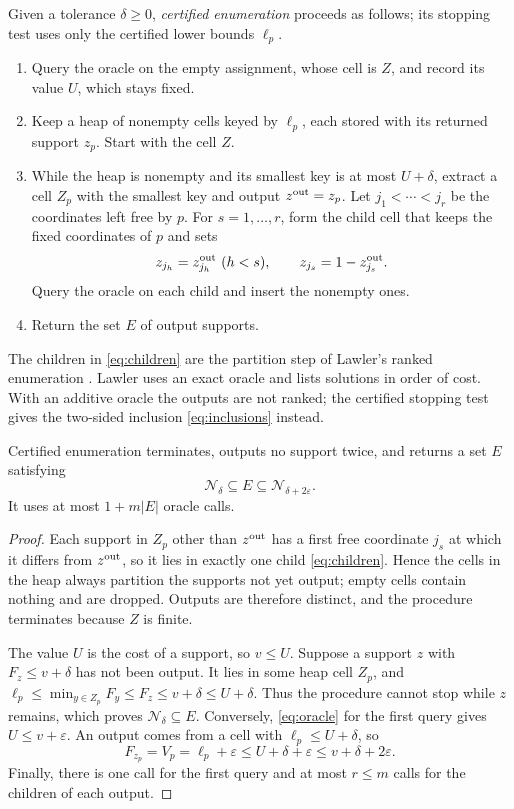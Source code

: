 Given a tolerance $\delta\ge0$, \emph{certified enumeration} proceeds as
follows; its stopping test uses only the certified lower bounds $\ell_p$.
\begin{enumerate}
\item Query the oracle on the empty assignment, whose cell is $Z$, and
 record its value $U$, which stays fixed.
\item Keep a heap of nonempty cells keyed by $\ell_p$, each stored with
 its returned support $z_p$. Start with the cell $Z$.
\item While the heap is nonempty and its smallest key is at most
 $U+\delta$, extract a cell $Z_p$ with the smallest key and output
 $z^{\rm out}=z_p$. Let $j_1<\cdots<j_r$ be the coordinates left free by
 $p$. For $s=1,\ldots,r$, form the child cell that keeps the fixed
 coordinates of $p$ and sets
 \begin{equation}\label{eq:children}
  z_{j_h}=z^{\rm out}_{j_h}\ (h<s),\qquad
  z_{j_s}=1-z^{\rm out}_{j_s}.
 \end{equation}
 Query the oracle on each child and insert the nonempty ones.
\item Return the set $E$ of output supports.
\end{enumerate}
The children in \eqref{eq:children} are the partition step of Lawler's
ranked enumeration \cite{Lawler}. Lawler uses an exact oracle and lists
solutions in order of cost. With an additive oracle the outputs are not
ranked; the certified stopping test gives the two-sided inclusion
\eqref{eq:inclusions} instead.

\begin{lemma}\label{lem:enumeration}
Certified enumeration terminates, outputs no support twice, and returns a
set $E$ satisfying
\begin{equation}\label{eq:inclusions}
 \mathcal N_\delta\subseteq E\subseteq\mathcal N_{\delta+2\varepsilon}.
\end{equation}
It uses at most $1+m|E|$ oracle calls.
\end{lemma}

\begin{proof}
Each support in $Z_p$ other than $z^{\rm out}$ has a first free
coordinate $j_s$ at which it differs from $z^{\rm out}$, so it lies in
exactly one child \eqref{eq:children}. Hence the cells in the heap always
partition the supports not yet output; empty cells contain nothing and
are dropped. Outputs are therefore distinct, and the procedure terminates
because $Z$ is finite.

The value $U$ is the cost of a support, so $v\le U$. Suppose a support
$z$ with $F_z\le v+\delta$ has not been output. It lies in some heap cell
$Z_p$, and
$\ell_p\le\min_{y\in Z_p}F_y\le F_z\le v+\delta\le U+\delta$. Thus the
procedure cannot stop while $z$ remains, which proves
$\mathcal N_\delta\subseteq E$. Conversely, \eqref{eq:oracle} for the
first query gives $U\le v+\varepsilon$. An output comes from a cell with
$\ell_p\le U+\delta$, so
\[
 F_{z_p}=V_p=\ell_p+\varepsilon\le U+\delta+\varepsilon
                \le v+\delta+2\varepsilon.
\]
Finally, there is one call for the first query and at most $r\le m$
calls for the children of each output.
\end{proof}

